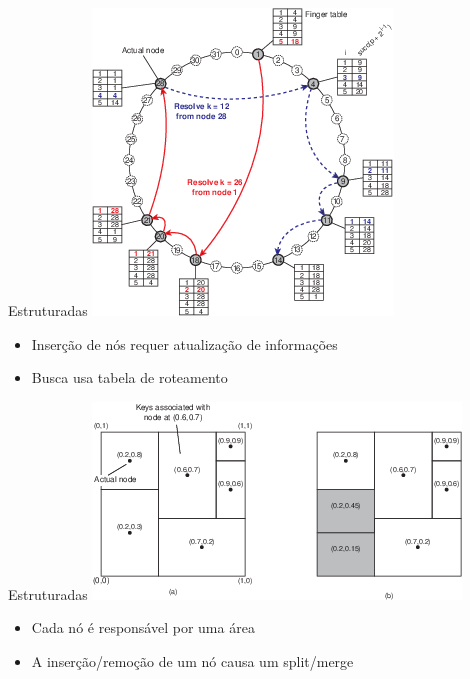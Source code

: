 \begin{frame}{Estruturadas}
\includegraphics[width=.45\textwidth]{images/05-04}	

\begin{itemize}
	\item Inserção de nós requer atualização de informações
	\item Busca usa tabela de roteamento
\end{itemize}
\end{frame}

\begin{frame}{Estruturadas}
\includegraphics[width=.7\textwidth]{images/02-08}	

\begin{itemize}
	\item Cada nó é responsável por uma área
	\item A inserção/remoção de um nó causa um split/merge
\end{itemize}
\end{frame}

